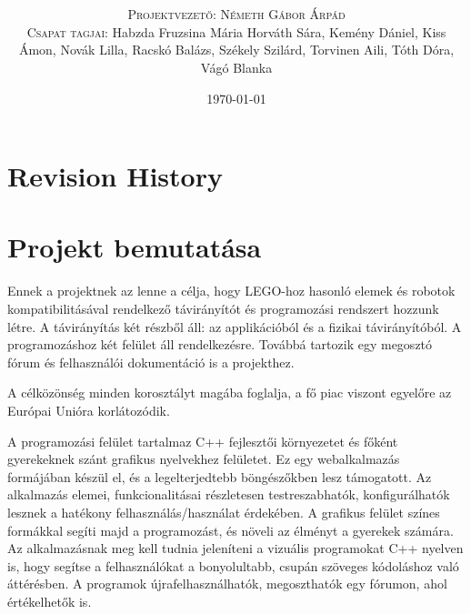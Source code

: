 \documentclass{article}
\title{\textbf{\BoldTitle}\\\Subtitle}
\author{\textsc{\Large Projektvezető: Németh Gábor Árpád} \\ \textsc{Csapat tagjai:} Habzda Fruzsina Mária Horváth Sára, Kemény Dániel, Kiss Ámon, Novák Lilla, Racskó Balázs, Székely Szilárd, Torvinen Aili, Tóth Dóra, Vágó Blanka}
\date{\today}
\begin{document}
\maketitle

\pagebreak
\tableofcontents %

\pagebreak
\section{Revision History}

\begin{versionhistory}
\end{versionhistory}


\pagebreak
\section{Projekt bemutatása}

Ennek a projektnek az lenne a célja, hogy LEGO-hoz hasonló elemek és robotok kompatibilitásával rendelkező távirányítót és programozási rendszert hozzunk létre. A távirányítás két részből áll: az applikációból és a fizikai távirányítóból. A programozáshoz két felület áll rendelkezésre. Továbbá tartozik egy megosztó fórum és felhasználói dokumentáció is a projekthez.
\newline

A célközönség minden korosztályt magába foglalja, a fő piac viszont egyelőre az Európai Unióra korlátozódik.
\newline

A programozási felület tartalmaz C++ fejlesztői környezetet és főként gyerekeknek szánt grafikus nyelvekhez felületet. Ez egy webalkalmazás formájában készül el, és a legelterjedtebb böngészőkben lesz támogatott. Az alkalmazás elemei, funkcionalitásai részletesen testreszabhatók, konfigurálhatók lesznek a hatékony felhasználás/használat érdekében. A grafikus felület színes formákkal segíti majd a programozást, és növeli az élményt a gyerekek számára. Az alkalmazásnak meg kell tudnia jeleníteni a vizuális programokat C++ nyelven is, hogy segítse a felhasználókat a bonyolultabb, csupán szöveges kódoláshoz való áttérésben.
A programok újrafelhasználhatók, megoszthatók egy fórumon, ahol értékelhetők is.
\newline
\end{document}
